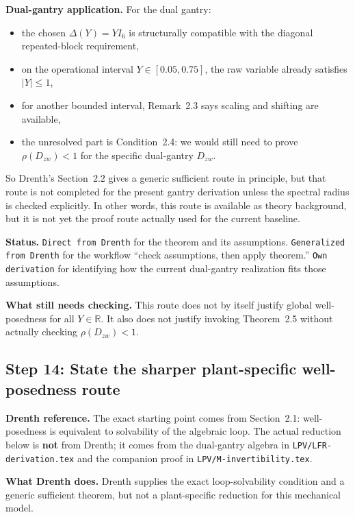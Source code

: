 ﻿\documentclass[11pt]{article}
\newcommand{\R}{\mathbb{R}}
\newcommand{\audititem}[2]{\par\smallskip\noindent\textbf{#1.} #2\par}
\newcommand{\statusline}[1]{\texttt{#1}}
\begin{document}
\audititem{Dual-gantry application}{For the dual gantry:
\begin{itemize}[leftmargin=1.2em]
    \item the chosen $\Delta(Y)=YI_6$ is structurally compatible with the
    diagonal repeated-block requirement,
    \item on the operational interval $Y \in [0.05,0.75]$, the raw variable
    already satisfies $|Y| \leq 1$,
    \item for another bounded interval, Remark~2.3 says scaling and shifting are
    available,
    \item the unresolved part is Condition~2.4: we would still need to prove
    $\rho(D_{zw}) < 1$ for the specific dual-gantry $D_{zw}$.
\end{itemize}
So Drenth's Section~2.2 gives a generic sufficient route in principle, but that
route is not completed for the present gantry derivation unless the spectral
radius is checked explicitly. In other words, this route is available as theory
background, but it is not yet the proof route actually used for the current
baseline.}

\audititem{Status}{\statusline{Direct from Drenth} for the theorem and its
assumptions. \statusline{Generalized from Drenth} for the workflow
``check assumptions, then apply theorem.'' \statusline{Own derivation} for
identifying how the current dual-gantry realization fits those assumptions.}

\audititem{What still needs checking}{This route does not by itself justify
global well-posedness for all $Y \in \R$. It also does not justify invoking
Theorem~2.5 without actually checking $\rho(D_{zw}) < 1$.}

\subsection{Step 14: State the sharper plant-specific well-posedness route}

\audititem{Drenth reference}{The exact starting point comes from Section~2.1:
well-posedness is equivalent to solvability of the algebraic loop. The actual
reduction below is \textbf{not} from Drenth; it comes from the dual-gantry
algebra in \texttt{LPV/LFR-derivation.tex} and the companion proof in
\texttt{LPV/M-invertibility.tex}.}

\audititem{What Drenth does}{Drenth supplies the exact loop-solvability
condition and a generic sufficient theorem, but not a plant-specific reduction
for this mechanical model.}
\end{document}
